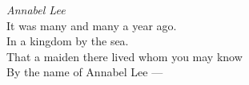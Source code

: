 \documentclass{article}
\begin{document}
\emph{Annabel Lee}\\
It was many and many a year ago. \\
In a kingdom by the sea. \\
That a maiden there lived whom you may know\\
By the name of Annabel Lee
---
\end{document}
